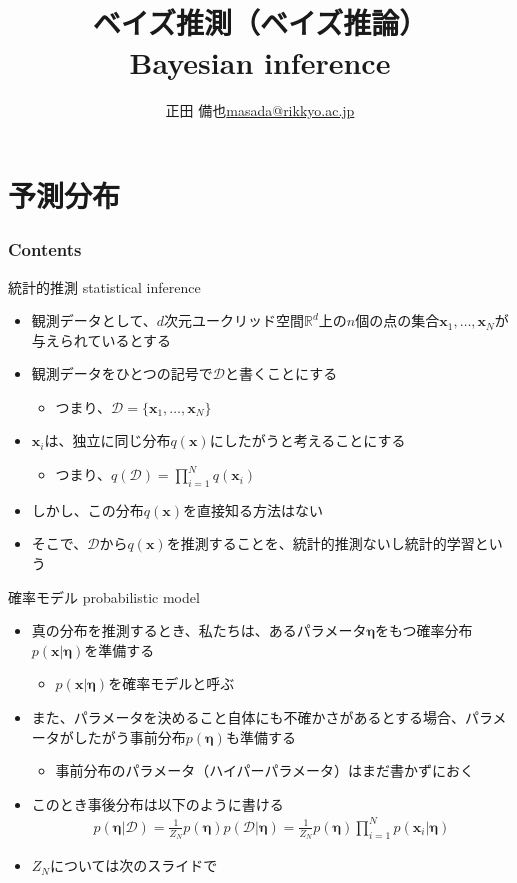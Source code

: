 \documentclass[aspectratio=169,unicode,dvipdfmx,14pt]{beamer}
\title{ \\ベイズ推測（ベイズ推論）\\ Bayesian inference}
\author{\texorpdfstring{正田 備也\newline\href{mailto:masada@rikkyo.ac.jp}{masada@rikkyo.ac.jp}}{正田 備也}}
\date{}
\begin{document}
\begin{frame}
\titlepage
\end{frame}

\section{予測分布}

\begin{frame}\frametitle{Contents}
\Large \tableofcontents[currentsection]
\end{frame}

\begin{frame}{統計的推測 statistical inference}
\begin{itemize}
\item 観測データとして、$d$次元ユークリッド空間$\mathbb{R}^d$上の$n$個の点の集合$\bm{x}_1,\ldots,\bm{x}_N$が与えられているとする
\item 観測データをひとつの記号で$\mathcal{D}$と書くことにする
\begin{itemize}
\item つまり、$\mathcal{D}=\{ \bm{x}_1,\ldots,\bm{x}_N \}$
\end{itemize}
\item $\bm{x}_i$は、独立に同じ分布$q(\bm{x})$にしたがうと考えることにする
\begin{itemize}
\item つまり、$q(\mathcal{D}) = \prod_{i=1}^N q(\bm{x}_i)$
\end{itemize}
\item しかし、この分布$q(\bm{x})$を直接知る方法はない
\item そこで、$\mathcal{D}$から$q(\bm{x})$を推測することを、統計的推測ないし統計的学習という
\end{itemize}
\end{frame}

\begin{frame}{確率モデル probabilistic model}
\begin{itemize}
\item 真の分布を推測するとき、私たちは、あるパラメータ$\bm{\eta}$をもつ確率分布$p(\bm{x}|\bm{\eta})$を準備する
\begin{itemize}
\item $p(\bm{x}|\bm{\eta})$を確率モデルと呼ぶ
\end{itemize}
\item また、パラメータを決めること自体にも不確かさがあるとする場合、パラメータがしたがう事前分布$p(\bm{\eta})$も準備する
\begin{itemize}
\item 事前分布のパラメータ（ハイパーパラメータ）はまだ書かずにおく
\end{itemize}
\item このとき事後分布は以下のように書ける
\begin{align}
p(\bm{\eta} | \mathcal{D}) = \frac{1}{Z_N} p(\bm{\eta}) p(\mathcal{D}|\bm{\eta})
= \frac{1}{Z_N} p(\bm{\eta}) \prod_{i=1}^N p(\bm{x}_i | \bm{\eta})
\label{eq:posterior}
\end{align}
\item $Z_N$については次のスライドで
\end{itemize}
\end{frame}
\end{document}
